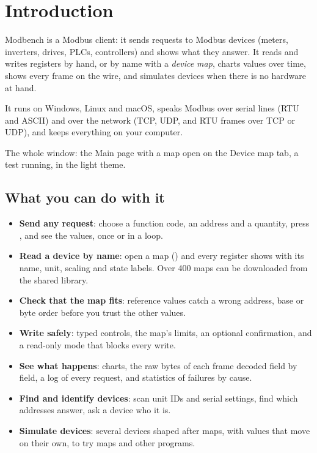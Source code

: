 \chapter{Introduction}

Modbench is a Modbus client: it sends requests to Modbus devices (meters,
inverters, drives, PLCs, controllers) and shows what they answer. It reads and
writes registers by hand, or by name with a \emph{device map}, charts values
over time, shows every frame on the wire, and simulates devices when there is
no hardware at hand.

It runs on Windows, Linux and macOS, speaks Modbus over serial lines (RTU and
ASCII) and over the network (TCP, UDP, and RTU frames over TCP or UDP), and
keeps everything on your computer.

  {The whole window: the Main page with a map open on the Device map tab, a test
   running, in the light theme.}

\section{What you can do with it}

\begin{itemize}
  \item \textbf{Send any request}: choose a function code, an address and a
        quantity, press , and see the values, once or in a loop.
  \item \textbf{Read a device by name}: open a map () and
        every register shows with its name, unit, scaling and state labels.
        Over 400 maps can be downloaded from the shared library.
  \item \textbf{Check that the map fits}: reference values catch a wrong
        address, base or byte order before you trust the other values.
  \item \textbf{Write safely}: typed controls, the map's limits, an optional
        confirmation, and a read-only mode that blocks every write.
  \item \textbf{See what happens}: charts, the raw bytes of each frame
        decoded field by field, a log of every request, and statistics of
        failures by cause.
  \item \textbf{Find and identify devices}: scan unit IDs and serial settings,
        find which addresses answer, ask a device who it is.
  \item \textbf{Simulate devices}: several devices shaped after maps, with
        values that move on their own, to try maps and other programs.
\end{itemize}

